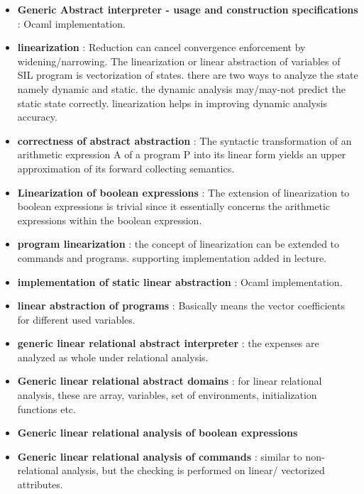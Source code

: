\begin{itemize}
	\item{\textbf{Generic Abstract interpreter - usage and construction specifications} : Ocaml implementation.
	}

	\item{\textbf{linearization} : Reduction can cancel convergence enforcement by widening/narrowing. The linearization or linear abstraction of variables of SIL program is vectorization of states. there are two ways to analyze the state namely dynamic and static. the dynamic analysis may/may-not predict the static state correctly. linearization helps in improving dynamic analysis accuracy.

	}

	\item{\textbf{correctness of abstract abstraction} : The syntactic transformation of an arithmetic expression A of a program P into its linear form yields an upper approximation of its forward collecting semantics.
	}

	\item{\textbf{Linearization of boolean expressions} : The extension of linearization to boolean expressions is trivial since it essentially concerns the arithmetic expressions within the boolean expression.
	}

	\item{\textbf{program linearization} : the concept of linearization can be extended to commands and programs. supporting implementation added in lecture.
	}

	\item{\textbf{implementation of static linear abstraction} : Ocaml implementation.
	}

	\item{\textbf{linear abstraction of programs} : Basically means the vector coefficients for different used variables. 
	}

	\item{\textbf{generic linear relational abstract interpreter} : the expenses are analyzed as whole under relational analysis. 
	}

	\item{\textbf{Generic linear relational abstract domains} : for linear relational analysis, these are array, variables, set of environments, initialization functions etc.
	}

	\item{\textbf{Generic linear relational analysis of boolean expressions}  
	}

	\item{\textbf{Generic linear relational analysis of commands} : similar to non-relational analysis, but the checking is performed on linear/ vectorized attributes.
	}


\end{itemize}
